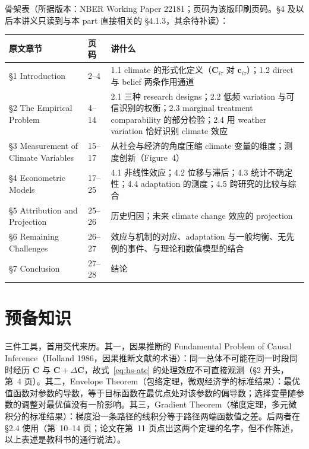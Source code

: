 骨架表（所据版本：NBER Working Paper 22181；页码为该版印刷页码。\S 4 及以后本讲义只读到与本 part 直接相关的 \S 4.1.3，其余待补读）：

\begin{table}[htbp]
\centering\small
\begin{tabular}{@{}p{4.4cm}p{1.4cm}p{7.2cm}@{}}
\toprule
原文章节 & 页码 & 讲什么 \\
\midrule
\S 1 Introduction & 2--4 & 1.1 climate 的形式化定义（$\mathbf{C}_{i\tau}$ 对 $\mathbf{c}_{i\tau}$）；1.2 direct 与 belief 两条作用通道 \\
\S 2 The Empirical Problem & 4--14 & 2.1 三种 research designs；2.2 低频 variation 与可信识别的权衡；2.3 marginal treatment comparability 的部分检验；2.4 用 weather variation 恰好识别 climate 效应 \\
\S 3 Measurement of Climate Variables & 15--17 & 从社会与经济的角度压缩 climate 变量的维度；测度创新（Figure~4） \\
\S 4 Econometric Models & 17--25 & 4.1 非线性效应；4.2 位移与滞后；4.3 统计不确定性；4.4 adaptation 的测度；4.5 跨研究的比较与综合 \\
\S 5 Attribution and Projection & 25--26 & 历史归因；未来 climate change 效应的 projection \\
\S 6 Remaining Challenges & 26--27 & 效应与机制的对应、adaptation 与一般均衡、无先例的事件、与理论和数值模型的结合 \\
\S 7 Conclusion & 27--28 & 结论 \\
\bottomrule
\end{tabular}
\end{table}

\section{预备知识}

三件工具，首用交代来历。其一，因果推断的 Fundamental Problem of Causal Inference（Holland 1986，因果推断文献的术语）：同一总体不可能在同一时段同时经历 $\mathbf{C}$ 与 $\mathbf{C}+\Delta\mathbf{C}$，故式~\ref{eq:hs-ate} 的处理效应不可直接观测（\S 2 开头，第~4 页）。其二，Envelope Theorem（包络定理，微观经济学的标准结果）：最优值函数对参数的导数，等于目标函数在最优点处对该参数的偏导数；选择变量随参数的调整对最优值没有一阶影响。其三，Gradient Theorem（梯度定理，多元微积分的标准结果）：梯度沿一条路径的线积分等于路径两端函数值之差。后两者在 \S 2.4 使用（第~10--14 页；论文在第~11 页点出这两个定理的名字，但不作陈述，以上表述是教科书的通行说法）。

